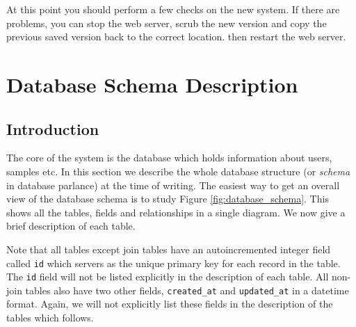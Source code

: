 \documentclass[12pt,twoside]{article}
\begin{document}
At this point you should perform a few checks on the new system. If there are
problems, you can stop the web server, scrub the new version and copy the 
previous saved version back to the correct location. then restart the web
server.


\section{Database Schema Description}\label{sec:database}
\subsection{Introduction}
The core of the system is the database which holds information about 
users, samples etc. In this section we describe the whole database
structure (or \emph{schema} in database parlance) at the time
of writing.
The easiest way to get an overall view of the database schema is to
study Figure \ref{fig:database_schema}. This shows
all the tables, fields and relationships in a single diagram.
We now give a brief description of each table.

Note that all tables except join tables have an autoincremented integer field
called \verb=id= which servers as the unique primary key for each record
in the table. The \verb=id= field will not be listed explicitly in the
description of each table. All non-join tables also have two other
fields, \verb=created_at= and \verb=updated_at= in a datetime format.
Again, we will not explicitly list these fields in the description
of the tables which follows.
\end{document}
